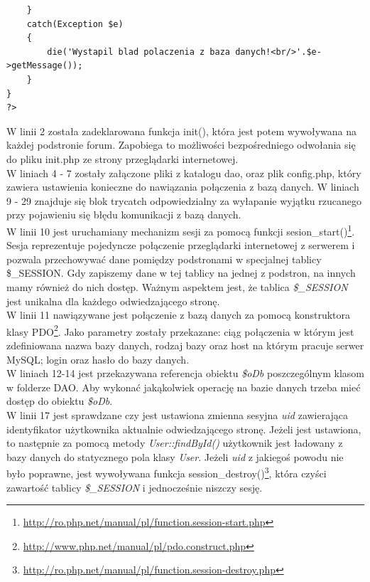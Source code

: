 \documentclass[a4paper,10pt]{article}
\begin{document}
{\begin{verbatim}
	}
	catch(Exception $e)
	{
		die('Wystapil blad polaczenia z baza danych!<br/>'.$e->getMessage());
	}
}
?>
\end{verbatim}
W linii 2 została zadeklarowana funkcja init(), która jest potem wywoływana na każdej podstronie forum. Zapobiega to możliwości bezpośredniego odwołania się do pliku init.php ze strony przeglądarki internetowej. \\
W liniach 4 - 7  zostały załączone pliki z katalogu dao, oraz plik config.php, który zawiera ustawienia konieczne do nawiązania połączenia z bazą danych.
W liniach 9 - 29 znajduje się blok try{}catch{} odpowiedzialny za wyłapanie wyjątku rzucanego przy pojawieniu się błędu komunikacji z bazą danych. \\
W linii 10 jest uruchamiany mechanizm sesji za pomocą funkcji sesion\_start()\footnote{\href{http://ro.php.net/manual/pl/function.session-start.php}{http://ro.php.net/manual/pl/function.session-start.php}}. Sesja reprezentuje pojedyncze połączenie przeglądarki internetowej z serwerem i pozwala przechowywać dane pomiędzy podstronami w specjalnej tablicy \$\_SESSION. Gdy zapiszemy dane w tej tablicy na jednej z podstron, na innych mamy również do nich dostęp. Ważnym aspektem jest, że tablica \textit{\$\_SESSION} jest unikalna dla każdego odwiedzającego stronę. \\
W linii 11 nawiązywane jest połączenie z bazą danych za pomocą konstruktora klasy PDO\footnote{\href{http://www.php.net/manual/pl/pdo.construct.php}{http://www.php.net/manual/pl/pdo.construct.php}}. Jako parametry zostały przekazane: ciąg połączenia w którym jest zdefiniowana nazwa bazy danych, rodzaj bazy oraz host na którym pracuje serwer MySQL; login oraz hasło do bazy danych. \\
W liniach 12-14 jest przekazywana referencja obiektu \textit{\$oDb} poszczególnym klasom w folderze DAO. Aby wykonać jakąkolwiek operację na bazie danych trzeba mieć dostęp do obiektu \textit{\$oDb}.\\
W linii 17 jest sprawdzane czy jest ustawiona zmienna sesyjna \textit{uid} zawierająca identyfikator użytkownika aktualnie odwiedzającego stronę. Jeżeli jest ustawiona, to następnie za pomocą metody \textit{User::findById()} użytkownik jest ładowany z bazy danych do statycznego pola klasy \textit{User}. Jeżeli \textit{uid} z jakiegoś powodu nie było poprawne, jest wywoływana funkcja session\_destroy()\footnote{\href{http://ro.php.net/manual/pl/function.session-destroy.php}{http://ro.php.net/manual/pl/function.session-destroy.php}}, która czyści zawartość tablicy \textit{\$\_SESSION} i jednocześnie niszczy sesję.

}
\end{document}

